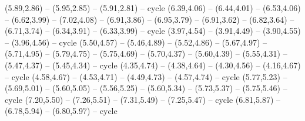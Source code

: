 \providecommand\Reich[1]{\csname geo:Reich:#1\endcsname}
\def\ReichListe{200}
\expandafter\def\csname geo:Reich:200\endcsname{
  (5.89,2.86) -- (5.95,2.85) -- (5.91,2.81) -- cycle
  (6.39,4.06) -- (6.44,4.01) -- (6.53,4.06) -- (6.62,3.99) -- (7.02,4.08) -- (6.91,3.86) -- (6.95,3.79) -- (6.91,3.62) -- (6.82,3.64) -- (6.71,3.74) -- (6.34,3.91) -- (6.33,3.99) -- cycle
  (3.97,4.54) -- (3.91,4.49) -- (3.90,4.55) -- (3.96,4.56) -- cycle
  (5.50,4.57) -- (5.46,4.89) -- (5.52,4.86) -- (5.67,4.97) -- (5.71,4.95) -- (5.79,4.75) -- (5.75,4.69) -- (5.70,4.37) -- (5.60,4.39) -- (5.55,4.31) -- (5.47,4.37) -- (5.45,4.34) -- cycle
  (4.35,4.74) -- (4.38,4.64) -- (4.30,4.56) -- (4.16,4.67) -- cycle
  (4.58,4.67) -- (4.53,4.71) -- (4.49,4.73) -- (4.57,4.74) -- cycle
  (5.77,5.23) -- (5.69,5.01) -- (5.60,5.05) -- (5.56,5.25) -- (5.60,5.34) -- (5.73,5.37) -- (5.75,5.46) -- cycle
  (7.20,5.50) -- (7.26,5.51) -- (7.31,5.49) -- (7.25,5.47) -- cycle
  (6.81,5.87) -- (6.78,5.94) -- (6.80,5.97) -- cycle
}

